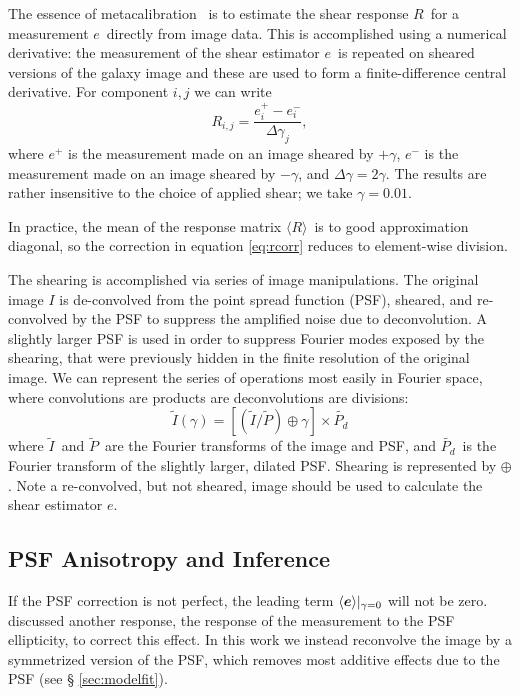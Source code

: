 \documentclass[iop]{emulateapj}
\newcommand{\vest}{\mbox{\boldmath $e$}}
\newcommand{\est}{e}
\newcommand{\mcal}{metacalibration}
\newcommand{\mcalR}{\mbox{\boldmath $R$}}
\newcommand{\mcalRmean}{\mbox{\boldmath $\langle R \rangle$}}
\newcommand{\Itild}{\mbox{$\widetilde{I}$}}
\newcommand{\Ptil}{\mbox{$\widetilde{P}$}}
\newcommand{\Ptild}{\mbox{$\widetilde{P_d}$}}
\begin{document}
The essence of \mcal\ \citep{HuffMcal} is to estimate the shear response
\mcalR\ for a measurement \vest\ directly from image data.  This is
accomplished using a numerical derivative: the measurement of
the shear estimator \vest\ is repeated on sheared versions of the galaxy
image and these are used to form a finite-difference central derivative.
For component $i,j$ we can write
\begin{equation} \label{eq:Rnum}
    R_{i,j} = \frac{\est_i^+ - \est_i^-}{\Delta \gamma_j},
\end{equation}
where $\est^+$ is the measurement made on an image sheared by $+\gamma$,
$\est^-$ is the measurement made on an image sheared by $-\gamma$,
and $\Delta \gamma = 2\gamma$.  The results are rather insensitive
to the choice of applied shear; we take $\gamma=0.01$.

In practice, the mean of the response matrix \mcalRmean\ is to good
approximation diagonal,  so the correction in equation \ref{eq:rcorr} reduces
to element-wise division.


The shearing is accomplished via series of image manipulations. The original
image $I$ is de-convolved from the point spread function (PSF), sheared, and
re-convolved by the PSF to suppress the amplified noise due to deconvolution.
A slightly larger PSF is used in order to suppress Fourier modes exposed by the
shearing, that were previously hidden in the finite resolution of the original
image.  We can represent the series of operations most easily
in Fourier space, where convolutions are products are deconvolutions
are divisions:
\begin{equation}
    \Itild(\gamma) = \left[ \left( \Itild/\Ptil \right) \oplus \gamma \right] \times \Ptild
\end{equation}
where \Itild\ and \Ptil\ are the Fourier transforms of the image
and PSF, and \Ptild\ is the Fourier transform of the slightly
larger, dilated PSF.  Shearing is represented by $\oplus$.
Note a re-convolved, but not sheared, image should be used
to calculate the shear estimator \vest.

\subsection{PSF Anisotropy and Inference} 

If the PSF correction is not perfect, the leading term $\langle \vest
\rangle|_{\gamma=0}$ will not be zero.  \cite{HuffMcal} discussed another
response, the response of the measurement to the PSF ellipticity, to correct
this effect.  In this work we instead reconvolve the image by a symmetrized
version of the PSF, which removes most additive effects due to the PSF  (see \S
\ref{sec:modelfit}).
\end{document}
